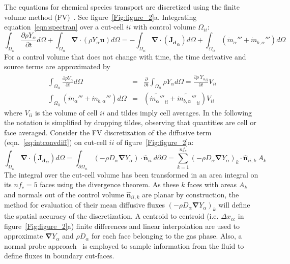 \documentclass[journal,article,atmosphere,submit,moreauthors,pdftex]{Definitions/mdpi}
\begin{document}
The equations for chemical species transport are discretized using the finite volume method (FV)~\cite{eymard_2000,leveque_2002}. See figure~\ref{Fig:figure_2}a. Integrating equation~\eqref{eqn:spectran} over a cut-cell $ii$ with control volume $\Omega_{ii}$:
%
\begin{equation}
 \int_{\Omega_{ii}} {\frac{\partial \rho Y_\alpha}{\partial t}} d \Omega + \int_{\Omega_{ii}} { \boldsymbol{\nabla} \cdot  \left(  \rho Y_\alpha \mathbf{u} \right)
      } d \Omega  = -\int_{\Omega_{ii}} { \boldsymbol{\nabla} \cdot \left(  \mathbf{J_{d}}_\alpha  \right)  } d \Omega + \int_{\Omega_{ii}} {( \dot{m}_\alpha'''+\dot{m}_{b,\alpha}''') } d \Omega \label{eq:intconvdiff}
\end{equation}
%
For a control volume that does not change with time, the time derivative and source terms are approximated by
%
\begin{eqnarray}
  \int_{\Omega_{ii}} {\frac{\partial \rho Y_\alpha}{\partial t}} d \Omega & = & \frac{\partial}{\partial t} \int_{\Omega_{ii}} {\rho Y_\alpha} d \Omega
  = \frac{\partial \widetilde{\rho \: Y_\alpha }_{ii}}{\partial t} V_{ii} \\
  \int_{\Omega_{ii}} {( \dot{m}_\alpha''' +\dot{m}_{b,\alpha}''')} d \Omega & = & (\widetilde{ \dot{m}_\alpha''' }_{ii}+ \widetilde{\dot{m}_{b,\alpha}'''}_{ii}) V_{ii} \label{eq:intcons}
\end{eqnarray}
%
where $V_{ii}$ is the volume of cell $ii$ and tildes imply cell averages. In the following the notation is simplified by dropping tildes, observing that quantities are cell or face averaged. Consider the FV discretization of the diffusive term (eqn.~\eqref{eq:intconvdiff}) on cut-cell $ii$ of figure~\ref{Fig:figure_2}a:
%
\begin{equation}
\int_{\Omega_{ii}} { \boldsymbol{\nabla} \cdot \left(  \mathbf{J_{d}}_\alpha  \right)  } d \Omega =
    \int_{\partial \Omega_{ii}} { \left( - \rho D_\alpha \boldsymbol{\nabla} Y_\alpha \right) \cdot \hat{\mathbf{n}}_{ii} } \: d \partial \Omega = \sum^{nf_c}_{k=1}
    \left( - \rho D_\alpha \boldsymbol{\nabla} Y_\alpha \right)_k \cdot \hat{\mathbf{n}}_{ii,k} \: A_k \label{eq:discfvdiffcc}
\end{equation}
%
The integral over the cut-cell volume has been transformed in an area integral on its $nf_c=5$ faces using the divergence theorem. As these $k$ faces with areas $A_k$ and normals out of the control volume $\hat{\mathbf{n}}_{ii,k}$ are planar by construction, the method for evaluation of their mean diffusive fluxes $\left( - \rho D_\alpha \boldsymbol{\nabla} Y_\alpha \right)_k$ will define the spatial accuracy of the discretization. A centroid to centroid (i.e. $\Delta x_{cc}$ in figure~\ref{Fig:figure_2}a) finite differences and linear interpolation are used to approximate $\boldsymbol{\nabla} Y_\alpha$ and $\rho D_\alpha$ for each face belonging to the gas phase. Also, a normal probe approach~\cite{balaras_2004} is employed to sample information from the fluid to define fluxes in boundary cut-faces.
\end{document}
